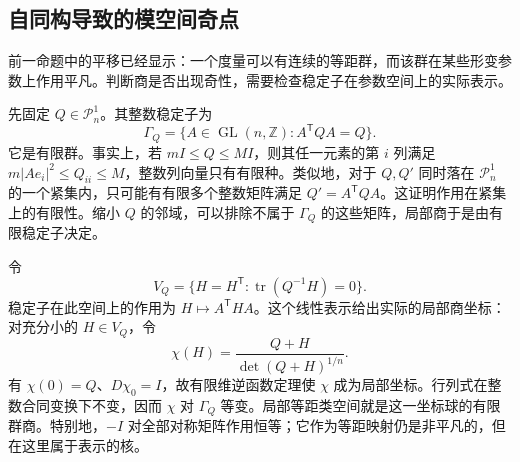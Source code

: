 \subsection{自同构导致的模空间奇点}
\label{g3:subsec:2504:02}
前一命题中的平移已经显示：一个度量可以有连续的等距群，而该群在某些形变参数上作用平凡。判断商是否出现奇性，需要检查稳定子在参数空间上的实际表示。

先固定 \(Q\in\mathcal P_n^1\)。其整数稳定子为
\[
	\Gamma_Q=\{A\in\operatorname{GL}(n,\mathbb Z):A^{\mathsf T}QA=Q\}.
\]
它是有限群。事实上，若 \(mI\le Q\le MI\)，则其任一元素的第 \(i\) 列满足 \(m|Ae_i|^2\le Q_{ii}\le M\)，整数列向量只有有限种。类似地，对于 \(Q,Q'\) 同时落在 \(\mathcal P_n^1\) 的一个紧集内，只可能有有限多个整数矩阵满足 \(Q'=A^{\mathsf T}QA\)。这证明作用在紧集上的有限性。缩小 \(Q\) 的邻域，可以排除不属于 \(\Gamma_Q\) 的这些矩阵，局部商于是由有限稳定子决定。

令
\[
	V_Q=\{H=H^{\mathsf T}:\operatorname{tr}(Q^{-1}H)=0\}.
\]
稳定子在此空间上的作用为 \(H\mapsto A^{\mathsf T}HA\)。这个线性表示给出实际的局部商坐标：对充分小的 \(H\in V_Q\)，令
\[
	\chi(H)=\frac{Q+H}{\det(Q+H)^{1/n}}.
\]
有 \(\chi(0)=Q\)、\(D\chi_0=I\)，故有限维逆函数定理使 \(\chi\) 成为局部坐标。行列式在整数合同变换下不变，因而 \(\chi\) 对 \(\Gamma_Q\) 等变。局部等距类空间就是这一坐标球的有限群商。特别地，\(-I\) 对全部对称矩阵作用恒等；它作为等距映射仍是非平凡的，但在这里属于表示的核。

